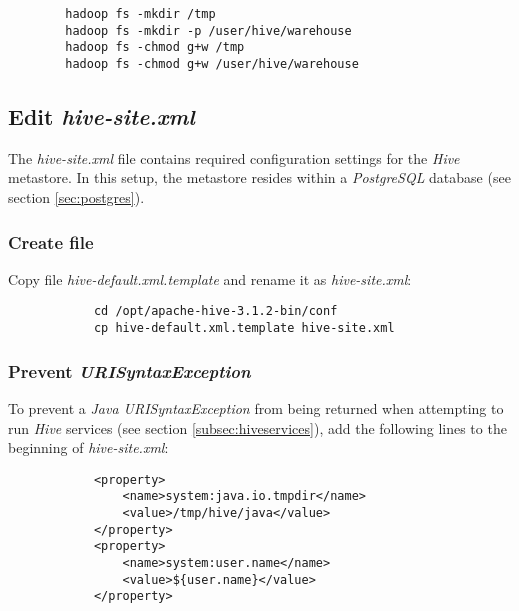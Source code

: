 \documentclass{article}
\begin{document}
    \begin{verbatim}
        hadoop fs -mkdir /tmp 
        hadoop fs -mkdir -p /user/hive/warehouse 
        hadoop fs -chmod g+w /tmp 
        hadoop fs -chmod g+w /user/hive/warehouse
    \end{verbatim}

    \subsection{Edit \emph{hive-site.xml}}
    The \emph{hive-site.xml} file contains required configuration settings for the \emph{Hive} metastore.
    In this setup, the metastore resides within a \emph{PostgreSQL} database (see section \ref{sec:postgres}).

        \subsubsection{Create file}
        Copy file \emph{hive-default.xml.template} and rename it as \emph{hive-site.xml}:
        \begin{verbatim}
            cd /opt/apache-hive-3.1.2-bin/conf
            cp hive-default.xml.template hive-site.xml
        \end{verbatim}

        \subsubsection{Prevent \emph{URISyntaxException}}
        To prevent a \emph{Java URISyntaxException} from being returned when attempting to run \emph{Hive}
        services (see section \ref{subsec:hiveservices}), add the following lines to the beginning of
        \emph{hive-site.xml}:
        \begin{verbatim}
            <property>
                <name>system:java.io.tmpdir</name>
                <value>/tmp/hive/java</value>
            </property>
            <property>
                <name>system:user.name</name>
                <value>${user.name}</value>
            </property>
        \end{verbatim}
\end{document}
